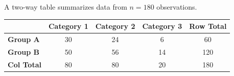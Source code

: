 \documentclass[10pt]{article}
\begin{document}
\namedateperiod

\vspace{0.12in}

A two-way table summarizes data from $n = 180$ observations.

\vspace{0.08in}
\renewcommand{\arraystretch}{1.4}
\begin{tabularx}{0.78\linewidth}{l ccc c}
    & \textbf{Category 1} & \textbf{Category 2} & \textbf{Category 3} & \textbf{Row Total} \\
    \hline
    \textbf{Group A} & 30 & 24 & 6  & 60  \\
    \textbf{Group B} & 50 & 56 & 14 & 120 \\
    \hline
    \textbf{Col Total} & 80 & 80 & 20 & 180 \\
\end{tabularx}

\vspace{0.12in}
\end{document}
